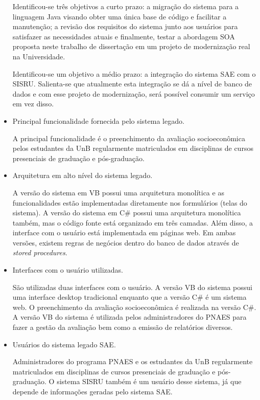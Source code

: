 \begin{itemize}
Identificou-se três objetivos a curto prazo: 
a migração do sistema para a linguagem Java visando obter 
uma única base de código e 
facilitar a manutenção; a revisão dos requisitos do sistema junto 
aos usuários para satisfazer as necessidades atuais e finalmente,
testar a abordagem \acrshort{SOA} proposta neste trabalho de 
dissertação em um projeto de modernização real na Universidade.

Identificou-se um objetivo a médio prazo: a integração
do sistema \acrshort{SAE} 
com o \acrfull{SISRU}. Salienta-se que atualmente esta
integração se dá a nível de banco de dados e com esse projeto de modernização, 
será possível consumir um serviço em vez disso.

\item Principal funcionalidade fornecida pelo sistema legado.

A principal funcionalidade é o preenchimento da avaliação socioeconômica pelos estudantes 
da \acrshort{UnB} regularmente matriculados em disciplinas de cursos presenciais
de graduação e pós-graduação.


\item Arquitetura em alto nível do sistema legado.

A versão do sistema em VB possui uma arquitetura monolítica e as funcionalidades 
estão implementadas diretamente nos formulários (telas do sistema). 
A versão do sistema em C\# 
possui uma arquitetura monolítica também, mas o código fonte está organizado em três 
camadas. Além disso, a interface com o usuário está 
implementada em páginas web. Em ambas versões, 
existem regras de negócios
dentro do banco de dados através de \textit{stored procedures}.

\item Interfaces com o usuário utilizadas.

São utilizadas duas interfaces com o usuário. A versão VB do
sistema possui uma
interface desktop tradicional enquanto que a
versão C\# é um sistema web. O preenchimento da avaliação socioeconômica 
é realizada na versão C\#. A versão
VB do sistema é utilizada pelos administradores do \acrshort{PNAES} para 
fazer a gestão da avaliação bem como a emissão de relatórios diversos. 

\item Usuários do sistema legado \acrshort{SAE}.

Administradores do programa \acrshort{PNAES} e os estudantes da \acrshort{UnB}
regularmente matriculados em disciplinas de cursos presenciais
de graduação e pós-graduação. O sistema \acrshort{SISRU} também é um usuário
desse sistema, já que depende de informações geradas pelo sistema \acrshort{SAE}.

\end{itemize}



